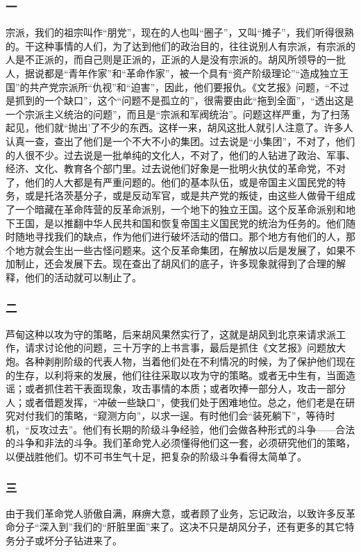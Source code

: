 \documentclass[cn,11pt,chinese]{elegantbook}
\def\myformat#1{\hfil\hfil #1}
\begin{document}
\subsubsection*{\myformat{一}}
宗派，我们的祖宗叫作“朋党”，现在的人也叫“圈子”，又叫“摊子”，我们听得很熟的。干这种事情的人们，为了达到他们的政治目的，往往说别人有宗派，有宗派的人是不正派的，而自己则是正派的，正派的人是没有宗派的。胡风所领导的一批人，据说都是“青年作家”和“革命作家”，被一个具有“资产阶级理论”“造成独立王国”的共产党宗派所“仇视”和“迫害”，因此，他们要报仇。《文艺报》问题，“不过是抓到的一个缺口”，这个“问题不是孤立的”，很需要由此“拖到全面”，“透出这是一个宗派主义统治的问题”，而且是“宗派和军阀统治”。问题这样严重，为了扫荡起见，他们就“抛出’了不少的东西。这样一来，胡风这批人就引人注意了。许多人认真一查，查出了他们是一个不大不小的集团。过去说是“小集团”，不对了，他们的人很不少。过去说是一批单纯的文化人，不对了，他们的人钻进了政治、军事、经济、文化、教育各个部门里。过去说他们好象是一批明火执仗的革命党，不对了，他们的人大都是有严重问题的。他们的基本队伍，或是帝国主义国民党的特务，或是托洛茨基分子，或是反动军官，或是共产党的叛徒，由这些人做骨干组成了一个暗藏在革命阵营的反革命派别，一个地下的独立王国。这个反革命派别和地下王国，是以推翻中华人民共和国和恢复帝国主义国民党的统治为任务的。他们随时随地寻找我们的缺点，作为他们进行破坏活动的借口。那个地方有他们的人，那个地方就会生出一些古怪问题来。这个反革命集团，在解放以后是发展了，如果不加制止，还会发展下去。现在查出了胡风们的底子，许多现象就得到了合理的解释，他们的活动就可以制止了。\\
\subsubsection*{\myformat{二}}
芦甸这种以攻为守的策略，后来胡风果然实行了，这就是胡风到北京来请求派工作，请求讨论他的问题，三十万字的上书言事，最后是抓住《文艺报》问题放大炮。各种剥削阶级的代表人物，当着他们处在不利情况的时候，为了保护他们现在的生存，以利将来的发展，他们往往采取以攻为守的策略。或者无中生有，当面造谣；或者抓住若干表面现象，攻击事情的本质；或者吹捧一部分人，攻击一部分人；或者借题发挥，“冲破一些缺口”，使我们处于困难地位。总之，他们老是在研究对付我们的策略，“窥测方向”，以求一逞。有时他们会“装死躺下”，等待时机，“反攻过去”。他们有长期的阶级斗争经验，他们会做各种形式的斗争——合法的斗争和非法的斗争。我们革命党人必须懂得他们这一套，必须研究他们的策略，以便战胜他们。切不可书生气十足，把复杂的阶级斗争看得太简单了。\\
\subsubsection*{\myformat{三}}
由于我们革命党人骄傲自满，麻痹大意，或者顾了业务，忘记政治，以致许多反革命分子“深入到”我们的“肝脏里面”来了。这决不只是胡风分子，还有更多的其它特务分子或坏分子钻进来了。\\
\end{document}
